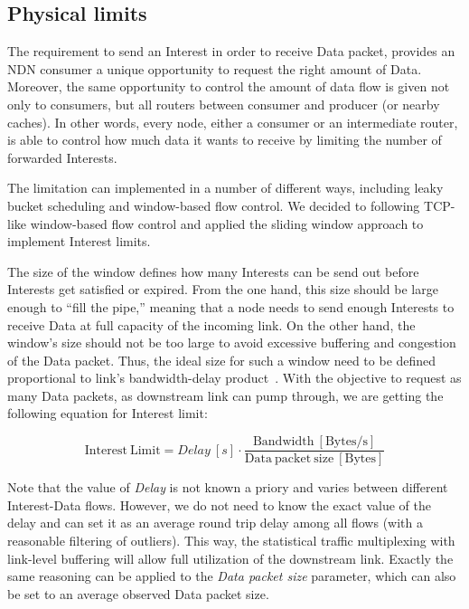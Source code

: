 \subsection{Physical limits}
\label{sec:physical limits}

The requirement to send an Interest in order to receive Data packet, provides an NDN consumer a unique opportunity to request the right amount of Data.
Moreover, the same opportunity to control the amount of data flow is given not only to consumers, but all routers between consumer and producer (or nearby caches).  
In other words, every node, either a consumer or an intermediate router, is able to control how much data it wants to receive by limiting the number of forwarded Interests.

The limitation can implemented in a number of different ways, including leaky bucket scheduling and window-based flow control.
We decided to following TCP-like window-based flow control and applied the sliding window approach to implement Interest limits.

The size of the window defines how many Interests can be send out before Interests get satisfied or expired.
From the one hand, this size should be large enough to ``fill the pipe,'' meaning that a node needs to send enough Interests to receive Data at full capacity of the incoming link.
On the other hand, the window's size should not be too large to avoid excessive buffering and congestion of the Data packet.
Thus, the ideal size for such a window need to be defined proportional to link's bandwidth-delay product~\cite{tcp-survey}.
With the objective to request as many Data packets, as downstream link can pump through, we are getting the following equation for Interest limit:

\begin{equation}
\mathrm{Interest\ Limit} = Delay\ [s] \cdot \frac{\mathrm{Bandwidth\ [Bytes/s]}}{\mathrm{Data\ packet\ size\ [Bytes]}}
\end{equation}

Note that the value of \textit{Delay} is not known a priory and varies between different Interest-Data flows.
However, we do not need to know the exact value of the delay and can set it as an average round trip delay among all flows (with a reasonable filtering of outliers).
This way, the statistical traffic multiplexing with link-level buffering will allow full utilization of the downstream link.
Exactly the same reasoning can be applied to the \textit{Data packet size} parameter, which can also be set to an average observed Data packet size.

